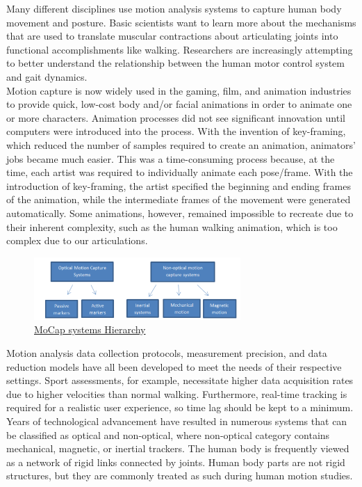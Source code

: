 Many different disciplines use motion analysis systems to capture human body movement and posture. Basic scientists want to learn more about the mechanisms that are used to translate muscular contractions about articulating joints into functional accomplishments like walking. Researchers are increasingly attempting to better understand the relationship between the human motor control system and gait dynamics.\\

Motion capture \cite{Review on Motion Capture Technology} is now widely used in the gaming, film, and animation industries to provide quick, low-cost body and/or facial animations in order to animate one or more characters. Animation processes did not see significant innovation until computers were introduced into the process. With the invention of key-framing, which reduced the number of samples required to create an animation, animators' jobs became much easier. This was a time-consuming process because, at the time, each artist was required to individually animate each pose/frame. With the introduction of key-framing, the artist specified the beginning and ending frames of the animation, while the intermediate frames of the movement were generated automatically. Some animations, however, remained impossible to recreate due to their inherent complexity, such as the human walking animation, which is too complex due to our articulations.

\begin{figure}[h]
	\centering
	\includegraphics[width=0.7\textwidth]{figures/background/Mocap.png}
	\caption{\href{https://encrypted-tbn0.gstatic.com/images?q=tbn:ANd9GcRNmJKWXW9WvSq-LKojP9PJvF245HXHpa7DUA&usqp=CAU}
	{MoCap systems Hierarchy}}
\end{figure}

Motion analysis data collection protocols, measurement precision, and data reduction models have all been developed to meet the needs of their respective settings. Sport assessments, for example, necessitate higher data acquisition rates due to higher velocities than normal walking. Furthermore, real-time tracking is required for a realistic user experience, so time lag should be kept to a minimum. Years of technological advancement have resulted in numerous systems that can be classified as optical and non-optical, where non-optical category contains mechanical, magnetic, or inertial trackers. The human body is frequently viewed as a network of rigid links connected by joints. Human body parts are not rigid structures, but they are commonly treated as such during human motion studies.